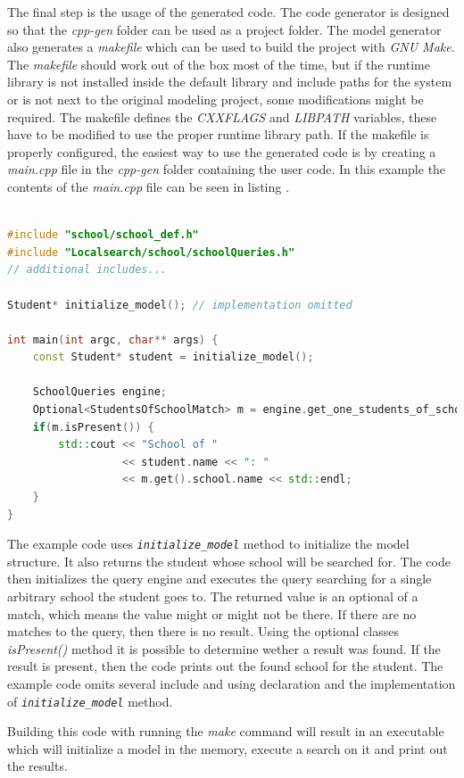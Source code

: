 The final step is the usage of the generated code. The code generator is
designed so that the \emph{cpp-gen} folder can be used as a project folder. The
model generator also generates a \emph{makefile} which can be used to build the
project with \emph{GNU Make}. The \emph{makefile} should work out of the box
most of the time, but if the runtime library is not installed inside the default
library and include paths for the system or is not next to the original modeling
project, some modifications might be required. The makefile defines the
\emph{CXXFLAGS} and \emph{LIBPATH} variables, these have to be modified to use
the proper runtime library path. If the makefile is properly configured, the
easiest way to use the generated code is by creating a \emph{main.cpp} file in
the \emph{cpp-gen} folder containing the user code. In this example the contents
of the \emph{main.cpp} file can be seen in listing .

\begin{lstlisting}[frame=single,float=!ht,language=C++,
label=listing:example_school_cpp, caption=Fragment of the \emph{main.cpp}
file for the example project]

#include "school/school_def.h"
#include "Localsearch/school/schoolQueries.h"
// additional includes...

Student* initialize_model(); // implementation omitted

int main(int argc, char** args) {
	const Student* student = initialize_model();
	
	SchoolQueries engine;
	Optional<StudentsOfSchoolMatch> m = engine.get_one_students_of_school(student); 
	if(m.isPresent()) { 
		std::cout << "School of " 
				  << student.name << ": " 
				  << m.get().school.name <<	std::endl; 
	}
}
\end{lstlisting}

The example code uses \emph{\texttt{initialize\_model}} method to initialize the
model structure. It also returns the student whose school will be searched for.
The code then initializes the query engine and executes the query searching for
a single arbitrary school the student goes to. The returned value is an optional
of a match, which means the value might or might not be there. If there are no
matches to the query, then there is no result. Using the optional classes
\emph{isPresent()} method it is possible to determine wether a result was found.
If the result is present, then the code prints out the found school for the
student. The example code omits several include and using declaration and the
implementation of \emph{\texttt{initialize\_model}} method.

Building this code with running the \emph{make} command will result in an
executable which will initialize a model in the memory, execute a search on it
and print out the results.

